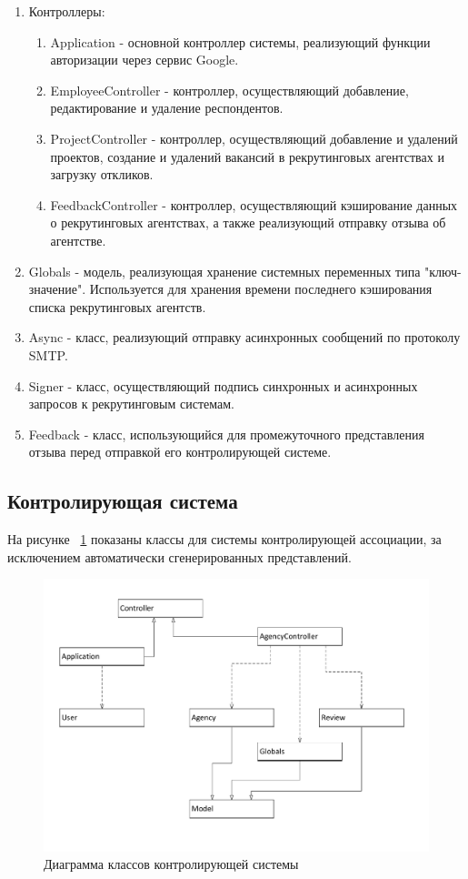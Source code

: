 \begin{enumerate}
\item Контроллеры:
\begin{enumerate}
\item Application - основной контроллер системы, реализующий функции авторизации через сервис Google.
\item EmployeeController - контроллер, осуществляющий добавление, редактирование и удаление респондентов.
\item ProjectController - контроллер, осуществляющий добавление и удалений проектов, создание и удалений вакансий в рекрутинговых агентствах и загрузку откликов.
\item FeedbackController - контроллер, осуществляющий кэширование данных о рекрутинговых агентствах, а также реализующий отправку отзыва об агентстве.
\end{enumerate}
\item Globals - модель, реализующая хранение системных переменных типа "ключ-значение". Используется для хранения времени последнего кэширования списка рекрутинговых агентств.
\item Async - класс, реализующий отправку асинхронных сообщений по протоколу SMTP.
\item Signer - класс, осуществляющий подпись синхронных и асинхронных запросов к рекрутинговым системам.
\item Feedback - класс, использующийся для промежуточного представления отзыва перед отправкой его контролирующей системе.
\end{enumerate}

\subsection{Контролирующая система}
На рисунке ~\ref{fig:class-supervising} показаны классы для системы контролирующей ассоциации, за исключением автоматически сгенерированных представлений.
\begin{figure}[ht]
  \centering
  \includegraphics[width=\textwidth]{include/class-supervising.pdf}
  \caption{Диаграмма классов контролирующей системы}
  \label{fig:class-supervising}
\end{figure}


